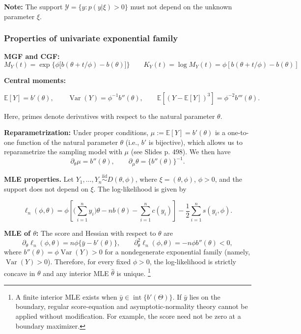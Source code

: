\documentclass{article}
\newenvironment{mybox}{%
  \par\addvspace{10pt}%
  \begin{mdframed}[skipabove=0pt,skipbelow=10pt]%
}{%
  \end{mdframed}%
}
\theoremstyle{break}
\newcommand{\E}{\ensuremath{\mathbb{E}}}
\DeclareMathOperator{\Var}{Var}
\begin{document}
\textbf{Note:} The support $\mathcal{Y}=\{y:p(y |\xi)>0\}$ must not depend on the unknown parameter $\xi$.

\subsubsection{Properties of univariate exponential family}
\textbf{MGF and CGF:} 
\[
M_Y(t) = \exp\Big\{\phi\big[b(\theta + t/\phi) - b(\theta)\big]\Big\}
\qquad
K_Y(t) = \log M_Y(t) = \phi[b(\theta + t/\phi) - b(\theta)]
\]

\textbf{Central moments:}
\begin{mybox}
\begin{equation}\label{eq:prelim-glm-exp-family-moments}
    \E[Y] = b'(\theta), 
    \qquad
    \Var(Y) = \phi^{-1} b''(\theta),
    \qquad
    \E[(Y - \E[Y])^3] = \phi^{-2} b'''(\theta).
\end{equation}
\end{mybox}
Here, primes denote derivatives with respect to the natural parameter $\theta$.

\textbf{Reparametrization:} Under proper conditions, $\mu := \E[Y] = b'(\theta)$ is a one-to-one function of the natural parameter $\theta$ (i.e., $b'$ is bijective), which allows us to reparametrize the sampling model with $\mu$ (see Slides p. 498). We then have
\[
\partial_\theta \mu = b''(\theta),\qquad \partial_\mu\theta = \{b''(\theta)\}^{-1}.
\]

\textbf{MLE properties.}
Let $Y_1,\ldots,Y_n\overset{\mathrm{iid}}{\sim}D(\theta,\phi)$, where $\xi=(\theta,\phi)$, $\phi>0$, and the support does not depend on $\xi$. The log-likelihood is given by
\begin{mybox}
\begin{equation}\label{eq:prelim-glm-exp-family-loglike}
    \ell_n(\phi,\theta)
    =
    \phi\left[
        \big(\sum_{i=1}^n y_i\big)\theta
        -nb(\theta)
        -\sum_{i=1}^n c(y_i)
    \right]
    -\frac{1}{2}\sum_{i=1}^n s(y_i,\phi).
\end{equation}
\end{mybox}

\textbf{MLE of $\theta$:} The score and Hessian with respect to $\theta$ are
\[
    \partial_\theta\ell_n(\phi,\theta)
    =n\phi\{\bar y-b'(\theta)\},
    \qquad
    \partial_\theta^2\ell_n(\phi,\theta)
    =-n\phi b''(\theta)<0,
\]
where $b''(\theta)=\phi\Var(Y)>0$ for a nondegenerate exponential family (namely, $\Var(Y) > 0$). 
Therefore, for every fixed $\phi>0$, the log-likelihood is strictly concave in $\theta$ and any interior MLE $\hat\theta$ is unique.
\footnote{A finite interior MLE exists when $\bar y\in\operatorname{int}\{b'(\Theta)\}$. If $\bar y$ lies on the boundary, regular score-equation and asymptotic-normality theory cannot be applied without modification. For example, the score need not be zero at a boundary maximizer.}
\end{document}
